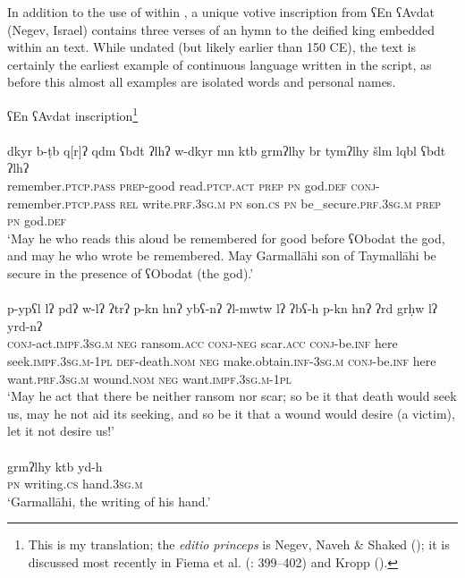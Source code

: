 \documentclass[output=paper]{langsci/langscibook}
\begin{document}
In addition to the use of  within , a unique votive inscription from ʕEn ʕAvdat (Negev, Israel) contains three verses of an  hymn to the deified  king  embedded within an  text. While undated (but likely earlier than 150 CE), the text is certainly the earliest example of continuous  language written in the  script, as before this almost all examples are isolated words and personal names.

\ea ʕEn ʕAvdat inscription\footnote{This is my translation; the \textit{editio princeps} is Negev, Naveh \& Shaked (\citeyear{Negevetal1986}); it is discussed most recently in Fiema et al. (\citeyear{Fiemaetal2015}: 399–402) and Kropp (\citeyear{Kropp2017}).} \\
 \\ 
\gll    dkyr b-ṭb q[r]ʔ qdm ʕbdt ʔlhʔ w-dkyr mn ktb grmʔlhy br tymʔlhy šlm lqbl ʕbdt ʔlhʔ \\
remember.\textsc{ptcp.pass} \textsc{prep}-good read.\textsc{ptcp.act} \textsc{prep} \textsc{pn} god.\textsc{def} \textsc{conj}-remember.\textsc{ptcp.pass} \textsc{rel} write.\textsc{prf.3sg.m} \textsc{pn} son.\textsc{cs} \textsc{pn} be\_secure.\textsc{prf.3sg.m} \textsc{prep} \textsc{pn} god.\textsc{def} \\ 
\glt `May he who reads this aloud be remembered for good before ʕObodat the god, and may he who wrote be remembered. May Garmallāhi son of Taymallāhi be secure in the presence of ʕObodat (the god).'\\

 \\
\gll   p-ypʕl lʔ pdʔ w-lʔ ʔtrʔ p-kn hnʔ ybʕ-nʔ ʔl-mwtw lʔ ʔbʕ-h p-kn hnʔ ʔrd grḥw lʔ yrd-nʔ \\
       \textsc{conj}-act.\textsc{impf.3sg.m} \textsc{neg} ransom.\textsc{acc} \textsc{conj}-\textsc{neg} scar.\textsc{acc} \textsc{conj}-be.\textsc{inf} here seek.\textsc{impf.3sg.m-1pl} \textsc{def}-death.\textsc{nom} \textsc{neg} make.obtain.\textsc{inf-3sg.m} \textsc{conj}-be.\textsc{inf} here want.\textsc{prf.3sg.m} wound.\textsc{nom} \textsc{neg} want.\textsc{impf.3sg.m-1pl} \\
\glt `May he act that there be neither ransom nor scar; so be it that death would seek us, may he not aid its seeking, and so be it that a wound would desire (a victim), let it not desire us!'\\

 \\
\gll   grmʔlhy ktb yd-h \\
\textsc{pn} writing.\textsc{cs} hand.\textsc{3sg.m} \\
\glt `Garmallāhi, the writing of his hand.’\\
\z
\z
\end{document}
